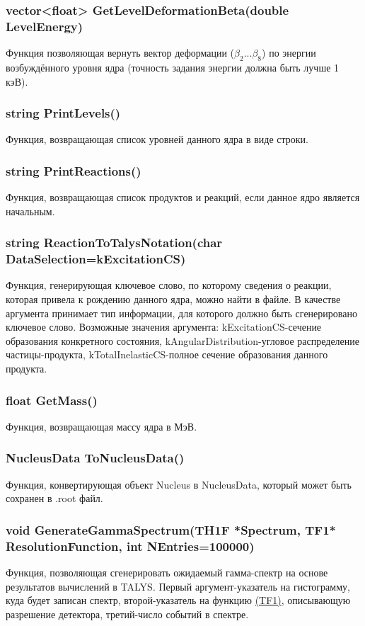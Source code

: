 \documentclass[a4paper,12pt]{extarticle}
\begin{document}
\subsubsection{vector<float> GetLevelDeformationBeta(double LevelEnergy)}
Функция позволяющая вернуть вектор деформации ($\beta_2...\beta_8$) по энергии возбуждённого уровня ядра (точность задания энергии должна быть лучше 1 кэВ).
\subsubsection{string PrintLevels()}
Функция, возвращающая список уровней данного ядра в виде строки.
\subsubsection{string PrintReactions()}
Функция, возвращающая список продуктов и реакций, если данное ядро является начальным.
\subsubsection{string ReactionToTalysNotation(char DataSelection=kExcitationCS)}
Функция, генерирующая ключевое слово, по которому сведения о реакции, которая привела к рождению данного ядра, можно найти в файле. В качестве аргумента принимает тип информации, для которого должно быть сгенерировано ключевое слово. Возможные значения аргумента: kExcitationCS-сечение образования конкретного состояния, kAngularDistribution-угловое распределение частицы-продукта, kTotalInelasticCS-полное сечение образования данного продукта.
\subsubsection{float GetMass()}
Функция, возвращающая массу ядра в МэВ.
\subsubsection{NucleusData ToNucleusData()}
Функция, конвертирующая объект Nucleus в NucleusData, который может быть сохранен в .root файл.
\subsubsection{void GenerateGammaSpectrum(TH1F *Spectrum, TF1* ResolutionFunction, int NEntries=100000)}
Функция, позволяющая сгенерировать ожидаемый гамма-спектр на основе результатов вычислений в TALYS. Первый аргумент-указатель на гистограмму, куда будет записан спектр, второй-указатель на функцию \href{https://root.cern.ch/doc/master/classTF1.html}{(TF1)}, описывающую разрешение детектора, третий-число событий в спектре.
\end{document}
